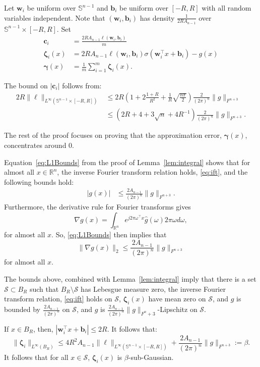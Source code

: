 \documentclass[twoside]{article}
\theoremstyle{definition}
\newcommand{\R}{\mathbb{R}}
\renewcommand{\S}{\mathbb{S}}
\newcommand{\cS}{\mathcal{S}}
\newcommand{\1}[1]{\scalebox{1.25}{$\mathds{1}$}\left[#1\right]}
\begin{document}
Let $\bm{w}_i$ be uniform over $\S^{n-1}$ and $\bm{b}_i$ be uniform over $[-R,R]$ with all random variables independent. Note that $(\bm{w}_i,\bm{b}_i)$ has density $\frac{1}{2RA_{n-1}}$ over $\S^{n-1}\times [-R,R]$. Set 
\begin{align*}
    \bm{c}_i &=\frac{2R A_{n-1} \ell(\bm{w}_i,\bm{b}_i)}{m} \\
    \bm{\zeta}_i(x)&=2 R A_{n-1}\ell(\bm{w}_i,\bm{b}_i)\sigma(\bm{w}_i^\top x+\bm{b}_i)-g(x) \\
    \bm{\gamma}(x)&=\frac{1}{m}\sum_{i=1}^m\bm{\zeta}_i(x).
\end{align*}

The bound on $|\bm{c}_i|$ follows from:
\begin{align*}
2R\|\ell\|_{L^{\infty}(\S^{n-1}\times [-R,R])}&\le 2R
\left(1+2\frac{1+ R}{R^2}+\frac{1}{R}\sqrt{\frac{n \pi}{2}}\right)\frac{2}{(2\pi)^n}\|g\|_{F^{n+3}} \\
&\le \left(2R + 4+
3\sqrt{n}  + 4R^{-1}\right)\frac{2}{(2\pi)^n}\|g\|_{F^{n+3}}.
\end{align*}

The rest of the proof focuses on proving that the approximation error, $\bm{\gamma}(x)$, concentrates around $0$.

Equation~\ref{eq:L1Bounds} from the proof of Lemma~\ref{lem:integral} shows that for almost all $x\in \R^n$, the inverse Fourier transform relation holds, \eqref{eq:ift}, and the following bounds hold:
\begin{align*}
|g(x)| &\le \frac{2A_{n-1}}{(2\pi)^{n}}\|g\|_{F^{n+3}}.
\end{align*}
Furthermore, the derivative rule for Fourier transforms gives
$$
\nabla g(x)=\int_{\R^n}e^{j2\pi \omega^\top x}\hat g(\omega)2\pi \omega d\omega, 
$$
for almost all $x$. So, \eqref{eq:L1Bounds} then implies that 
$$
\|\nabla g(x)\|_2\le \frac{2A_{n-1}}{(2\pi)^n}\|g\|_{F^{n+3}}
$$
for almost all $x$.

The bounds above, combined with Lemma~\ref{lem:integral} imply that 
there is a set $\cS\subset B_R$ such that $B_{R}\setminus \cS$ has Lebesgue measure zero, the inverse Fourier transform relation, \eqref{eq:ift} holds on $\cS$, $\bm{\zeta}_i(x)$ have mean zero on $\cS$, and $g$ is bounded by $\frac{2A_{n-1}}{(2\pi)^n}$ on $\cS$, and $g$ is $\frac{2A_{n-1}}{(2\pi)^n}\|g\|_{F^n+3}$-Lipschitz on $\cS$. 



If $x\in B_R$, then, $|\bm{w}_i^\top x + \bm{b}_i|\le 2R$. It follows that: 
$$
\|\bm{\zeta}_i\|_{L^{\infty}(B_R)}\le 4R^2 A_{n-1}\|\ell\|_{L^{\infty}(\S^{n-1}\times [-R,R])} + \frac{2A_{n-1}}{(2\pi)^n}\|g\|_{F^{n+3}}:=\beta.
$$
It follows that for all $x\in \cS$, $\bm{\zeta}_i(x)$ is $\beta$-sub-Gaussian.
\end{document}
